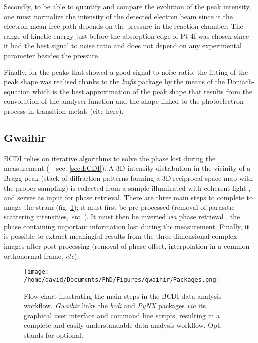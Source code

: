 Secondly, to be able to quantify and compare the evolution of the peak intensity, one must normalize the intensity of the detected electron beam since it the electron mean free path depends on the pressure in the reaction chamber.
The range of kinetic energy just before the absorption edge of Pt 4f was chosen since it had the best signal to noise ratio and does not depend on any experimental parameter besides the pressure.

Finally, for the peaks that showed a good signal to noise ratio, the fitting of the peak shape was realised thanks to the \textit{lmfit} \parencite{Newville2016} package by the means of the Doniach-equation which is the best approximation of the peak shape that results from the convolution of the analyser function and the shape linked to the photoelectron process in transition metals (cite here).

\subsection{Gwaihir} \label{sec:Gwaihir}

BCDI relies on iterative algorithms to solve the phase lost during the measurement (\cite{robinson_coherent_2009} - sec. \ref{sec:BCDI}).
A 3D intensity distribution in the vicinity of a Bragg peak (stack of diffraction patterns forming a 3D reciprocal space map with the proper sampling) is collected from a sample illuminated with coherent light \parencite{robinson_coherent_2005}, and serves as input for phase retrieval.
There are three main steps to complete to image the strain (fig. \ref{fig:Packages}); it must first be pre-processed (removal of parasitic scattering intensities, \textit{etc.} \parencite{ozturk_performance_2017}).
It must then be inverted \textit{via} phase retrieval \parencite{miao_possible_2000}, the phase containing important information lost during the measurement.
Finally, it is possible to extract meaningful results from the three dimensional complex images after post-processing (removal of phase offset, interpolation in a common orthonormal frame, \textit{etc}).

\begin{figure}[!htb]
    \texttt{[image: /home/david/Documents/PhD/Figures/gwaihir/Packages.png]}
    \caption{Flow chart illustrating the main steps in the BCDI data analysis workflow. \textit{Gwaihir} links the \textit{bcdi} and \textit{PyNX} packages \textit{via} its graphical user interface and command line scripts, resulting in a complete and easily understandable data analysis workflow. Opt. stands for optional.
    }
    \label{fig:Packages}
\end{figure}

